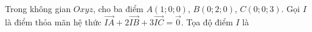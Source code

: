 \begin{ex}
Trong không gian $Oxyz$, cho ba điểm $A(1;0;0)$, $B(0;2;0)$, $C(0;0;3)$. Gọi $I$ là điểm thỏa mãn hệ thức $\overrightarrow{IA}+2\overrightarrow{IB}+3\overrightarrow{IC}=\overrightarrow{0}$. Tọa độ điểm $I$ là
\end{ex}
